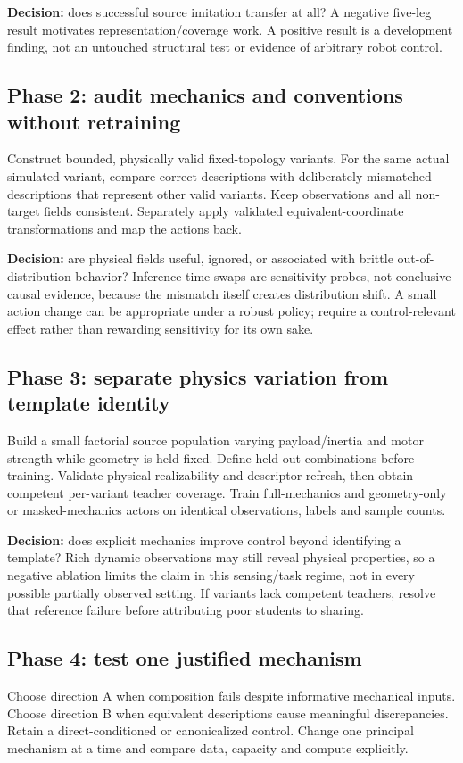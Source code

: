 \documentclass[11pt,letterpaper]{article}
\begin{document}
\textbf{Decision:} does successful source imitation transfer at all? A negative
five-leg result motivates representation/coverage work. A positive result is a
development finding, not an untouched structural test or evidence of arbitrary
robot control.

\subsection{Phase 2: audit mechanics and conventions without retraining}
Construct bounded, physically valid fixed-topology variants. For the same actual
simulated variant, compare correct descriptions with deliberately mismatched
descriptions that represent other valid variants. Keep observations and all
non-target fields consistent. Separately apply validated equivalent-coordinate
transformations and map the actions back.

\textbf{Decision:} are physical fields useful, ignored, or associated with brittle
out-of-distribution behavior? Inference-time swaps are sensitivity probes, not
conclusive causal evidence, because the mismatch itself creates distribution
shift. A small action change can be appropriate under a robust policy; require a
control-relevant effect rather than rewarding sensitivity for its own sake.

\subsection{Phase 3: separate physics variation from template identity}
Build a small factorial source population varying payload/inertia and motor
strength while geometry is held fixed. Define held-out combinations before
training. Validate physical realizability and descriptor refresh, then obtain
competent per-variant teacher coverage. Train full-mechanics and geometry-only or
masked-mechanics actors on identical observations, labels and sample counts.

\textbf{Decision:} does explicit mechanics improve control beyond identifying a
template? Rich dynamic observations may still reveal physical properties, so a
negative ablation limits the claim in this sensing/task regime, not in every
possible partially observed setting. If variants lack competent teachers,
resolve that reference failure before attributing poor students to sharing.

\subsection{Phase 4: test one justified mechanism}
Choose direction A when composition fails despite informative mechanical inputs.
Choose direction B when equivalent descriptions cause meaningful discrepancies.
Retain a direct-conditioned or canonicalized control. Change one principal
mechanism at a time and compare data, capacity and compute explicitly.
\end{document}
